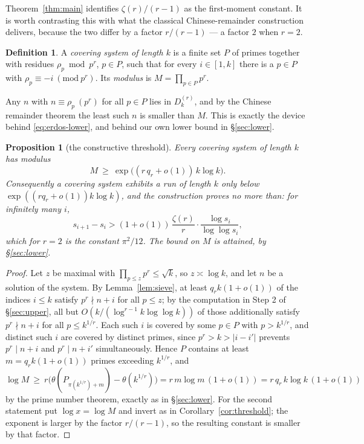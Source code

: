 \documentclass[11pt,reqno]{amsart}
\theoremstyle{plain}
\newtheorem{proposition}[theorem]{Proposition}
\theoremstyle{definition}
\newtheorem*{definition*}{Definition}
\numberwithin{equation}{section}
\begin{document}
Theorem~\ref{thm:main} identifies $\zeta(r)/(r-1)$ as the first-moment constant. It is worth
contrasting this with what the classical Chinese-remainder construction delivers, because
the two differ by a factor $r/(r-1)$ --- a factor $2$ when $r=2$.

\begin{definition*}
A \emph{covering system of length $k$} is a finite set $P$ of primes together with residues
$\rho_p\bmod p^{r}$, $p\in P$, such that for every $i\in[1,k]$ there is a $p\in P$ with
$\rho_p\equiv-i\ (\mathrm{mod}\ p^{r})$. Its \emph{modulus} is $M=\prod_{p\in P}p^{r}$.
\end{definition*}

Any $n$ with $n\equiv\rho_p\ (p^{r})$ for all $p\in P$ lies in $D^{(r)}_k$, and by the
Chinese remainder theorem the least such $n$ is smaller than $M$. This is exactly the device
behind \eqref{eq:erdos-lower}, and behind our own lower bound in \S\ref{sec:lower}.

\begin{proposition}[the constructive threshold]\label{prop:crt}
Every covering system of length $k$ has modulus
\[
  M\ \ge\ \exp\bigl((r\,q_r+o(1))\,k\log k\bigr).
\]
Consequently a covering system exhibits a run of length $k$ only below
$\exp((rq_r+o(1))k\log k)$, and the construction proves no more than: for infinitely many
$i$,
\[
  s_{i+1}-s_i>(1+o(1))\,\frac{\zeta(r)}{r}\cdot\frac{\log s_i}{\log\log s_i},
\]
which for $r=2$ is the constant $\pi^{2}/12$. The bound on $M$ is attained, by
\S\ref{sec:lower}.
\end{proposition}

\begin{proof}
Let $z$ be maximal with $\prod_{p\le z}p^{r}\le\sqrt k$, so $z\asymp\log k$, and let $n$ be
a solution of the system. By Lemma~\ref{lem:sieve}, at least $q_rk(1+o(1))$ of the indices
$i\le k$ satisfy $p^{r}\nmid n+i$ for all $p\le z$; by the computation in Step 2 of
\S\ref{sec:upper}, all but $O(k/(\log^{r-1}k\log\log k))$ of those additionally satisfy
$p^{r}\nmid n+i$ for all $p\le k^{1/r}$. Each such $i$ is covered by some $p\in P$ with
$p>k^{1/r}$, and distinct such $i$ are covered by distinct primes, since $p^{r}>k>|i-i'|$
prevents $p^{r}\mid n+i$ and $p^{r}\mid n+i'$ simultaneously. Hence $P$ contains at least
$m=q_rk(1+o(1))$ primes exceeding $k^{1/r}$, and
\[
  \log M\ \ge\ r\bigl(\theta(P_{\pi(k^{1/r})+m})-\theta(k^{1/r})\bigr)
  =r\,m\log m\,(1+o(1))=r\,q_r\,k\log k\,(1+o(1))
\]
by the prime number theorem, exactly as in \S\ref{sec:lower}. For the second statement put
$\log x=\log M$ and invert as in Corollary~\ref{cor:threshold}; the exponent is larger by
the factor $r/(r-1)$, so the resulting constant is smaller by that factor.
\end{proof}
\end{document}
